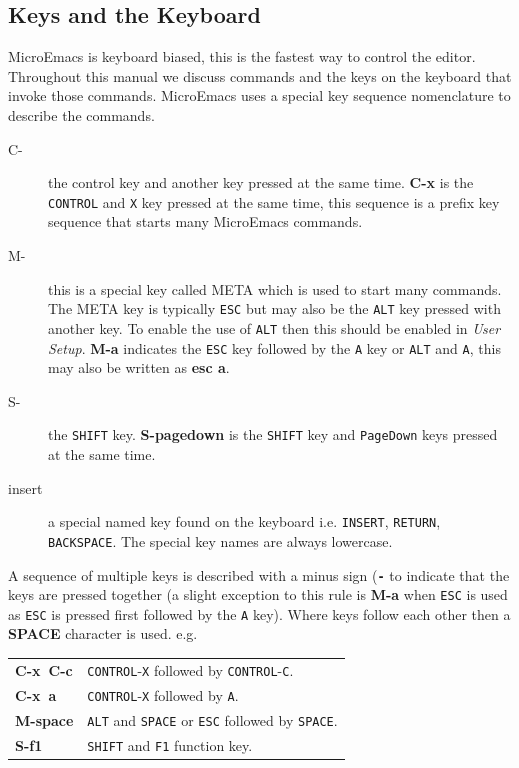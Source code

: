 \documentclass[11pt,a4paper,pdftex]{article}
\begin{document}
\subsection{Keys and the Keyboard}

  MicroEmacs is keyboard biased, this is the fastest way to control the
  editor. Throughout this manual we discuss commands and the keys on the
  keyboard that invoke those commands. MicroEmacs uses a special key sequence
  nomenclature to describe the commands.

  \begin{description}

    \item[C-] the control key and another key pressed at the same time.
    \textbf{C-x} is the \texttt{CONTROL} and \texttt{X} key pressed at the
    same time, this sequence is a prefix key sequence that starts many
    MicroEmacs commands.

    \item[M-] this is a special key called META which is used to start many
    commands. The META key is typically \texttt{ESC} but may also be the
    \texttt{ALT} key pressed with another key. To enable the use of
    \texttt{ALT} then this should be enabled in \textit{User Setup}.
    \textbf{M-a} indicates the \texttt{ESC} key followed by the \texttt{A} key
    or \texttt{ALT} and \texttt{A}, this may also be written as \textbf{esc
    a}.

    \item[S-] the \texttt{SHIFT} key. \textbf{S-pagedown} is the
    \texttt{SHIFT} key and \texttt{PageDown} keys pressed at the same time.

    \item[insert] a special named key found on the keyboard i.e.
    \texttt{INSERT}, \texttt{RETURN}, \texttt{BACKSPACE}. The special key
    names are always lowercase.

  \end{description}

  A sequence of multiple keys is described with a minus sign
  (\textbf{\texttt{-}} to indicate that the keys are pressed together (a
  slight exception to this rule is \textbf{M-a} when \texttt{ESC} is used as
  \texttt{ESC} is pressed first followed by the \texttt{A} key). Where keys
  follow each other then a \textbf{SPACE} character is used. e.g.

  \begin{longtable}{l@{\ --\ }l}
    \endhead
    \endfoot
    \endlastfoot
    \textbf{C-x~C-c} & \texttt{CONTROL}-\texttt{X} followed by
                       \texttt{CONTROL}-\texttt{C}.\\

    \textbf{C-x~a} & \texttt{CONTROL}-\texttt{X} followed by \texttt{A}.\\
    \textbf{M-space} & \texttt{ALT} and \texttt{SPACE} or \texttt{ESC} followed
                       by \texttt{SPACE}.\\
    \textbf{S-f1} & \texttt{SHIFT} and \texttt{F1} function key.\\
  \end{longtable}
\end{document}
